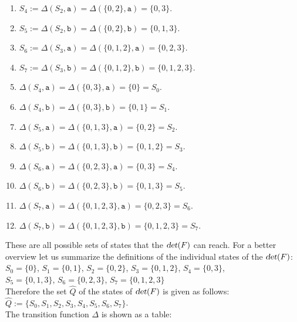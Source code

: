 \begin{enumerate}
      Similarly we derive the following:
\item $S_4 := \Delta(S_2, \texttt{a}) = \Delta(\{ 0, 2 \}, \texttt{a}) = \{0, 3 \}$.
\item $S_5 := \Delta(S_2, \texttt{b}) = \Delta(\{ 0, 2 \}, \texttt{b}) = \{0, 1, 3 \}$.
\item $S_6 := \Delta(S_3, \texttt{a}) = \Delta(\{ 0, 1, 2 \}, \texttt{a}) = \{0, 2, 3 \}$.
\item $S_7 := \Delta(S_3, \texttt{b}) = \Delta(\{ 0, 1, 2 \}, \texttt{b}) = \{0, 1, 2, 3 \}$.
\item $\Delta(S_4, \texttt{a}) = \Delta(\{ 0, 3 \}, \texttt{a}) = \{0 \} = S_0$.
\item $\Delta(S_4, \texttt{b}) = \Delta(\{ 0, 3 \}, \texttt{b}) = \{ 0, 1 \} = S_1$.
\item $\Delta(S_5, \texttt{a}) = \Delta(\{ 0, 1, 3 \}, \texttt{a}) = \{ 0, 2 \} = S_2$.
\item $\Delta(S_5, \texttt{b}) = \Delta(\{ 0, 1, 3 \}, \texttt{b}) = \{ 0, 1, 2 \} = S_3$.
\item $\Delta(S_6, \texttt{a}) = \Delta(\{ 0, 2, 3 \}, \texttt{a}) = \{ 0, 3 \} = S_4$.
\item $\Delta(S_6, \texttt{b}) = \Delta(\{ 0, 2, 3 \}, \texttt{b}) = \{ 0, 1, 3 \} = S_5$.
\item $\Delta(S_7, \texttt{a}) = \Delta(\{ 0, 1, 2, 3 \}, \texttt{a}) = \{ 0, 2, 3 \} = S_6$.
\item $\Delta(S_7, \texttt{b}) = \Delta(\{ 0, 1, 2, 3 \}, \texttt{b}) = \{ 0, 1, 2, 3 \} = S_7$.
\end{enumerate}
These are all possible sets of states that the  $\textsl{det}(F)$ can reach.
For a better overview let us summarize the definitions of the individual states of the  $\textsl{det}(F)$:
\\[0.2cm]
\hspace*{1.3cm} $S_0 = \{ 0 \}$, $S_1 = \{ 0, 1 \}$, $S_2 = \{ 0, 2 \}$,  $S_3 = \{ 0, 1, 2 \}$, $S_4 = \{ 0, 3 \}$,
\\[0.2cm]
\hspace*{1.3cm} $S_5 = \{ 0, 1, 3 \}$, $S_6 = \{ 0, 2, 3 \}$, $S_7 = \{ 0, 1, 2, 3 \}$
\\[0.2cm]
Therefore the set $\widehat{Q}$ of the states of $\textsl{det}(F)$ is given as follows:
\\[0.2cm]
\hspace*{1.3cm}
$\widehat{Q} := \{ S_0, S_1, S_2, S_3, S_4, S_5, S_6, S_7 \}$.
\\[0.2cm]
The transition function $\Delta$ is shown as a table:

